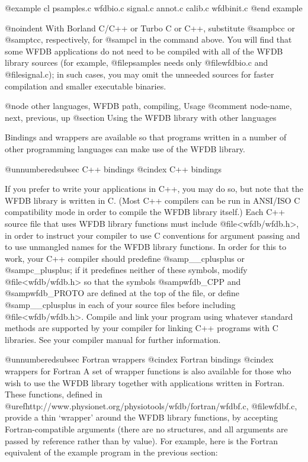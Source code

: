 {{@example
cl psamples.c wfdbio.c signal.c annot.c calib.c wfdbinit.c
@end example

@noindent
With Borland C/C++ or Turbo C or C++, substitute @samp{bcc} or
@samp{tcc}, respectively, for @samp{cl} in the command above.  You will
find that some WFDB applications do not need to be compiled with all of
the WFDB library sources (for example, @file{psamples} needs only
@file{wfdbio.c} and @file{signal.c}); in such cases, you may omit the
unneeded sources for faster compilation and smaller executable binaries.


@node     other languages, WFDB path, compiling, Usage
@comment  node-name,  next,  previous,  up
@section Using the WFDB library with other languages

Bindings and wrappers are available so that programs written in a
number of other programming languages can make use of the WFDB library.

@unnumberedsubsec C++ bindings
@cindex C++ bindings

If you prefer to write your applications in C++, you may do so, but note
that the WFDB library is written in C.  (Most C++ compilers can be run
in ANSI/ISO C compatibility mode in order to compile the WFDB library
itself.)  Each C++ source file that uses WFDB library functions must
include @file{<wfdb/wfdb.h>}, in order to instruct your compiler to use
C conventions for argument passing and to use unmangled names for the
WFDB library functions.  In order for this to work, your C++ compiler
should predefine @samp{__cplusplus} or @samp{c_plusplus}; if it
predefines neither of these symbols, modify @file{<wfdb/wfdb.h>} so that
the symbols @samp{wfdb_CPP} and @samp{wfdb_PROTO} are defined at the top
of the file, or define @samp{__cplusplus} in each of your source files
before including @file{<wfdb/wfdb.h>}.  Compile and link your program
using whatever standard methods are supported by your compiler for
linking C++ programs with C libraries.  See your compiler manual for
further information.

@unnumberedsubsec Fortran wrappers
@cindex Fortran bindings
@cindex wrappers for Fortran
A set of wrapper functions is also available for those who wish to use the WFDB
library together with applications written in Fortran.  These functions,
defined in @uref{http://www.physionet.org/physiotools/wfdb/fortran/wfdbf.c,
@file{wfdbf.c}}, provide a thin `wrapper' around the WFDB library functions, by
accepting Fortran-compatible arguments (there are no structures, and all
arguments are passed by reference rather than by value).  For example, here is
the Fortran equivalent of the example program in the previous section:

}}

